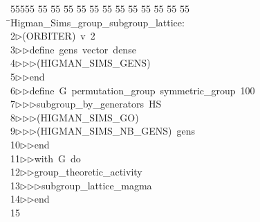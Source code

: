 %
%
\begin{tabbing}
55555 \= 55 \= 55 \= 55 \= 55 \= 55 \= 55 \= 55 \= 55 \= 55 \= 55 \= 55 \= 55 \= \>Higman\_Sims\_group\_subgroup\_lattice:\\[0pt]
2\>$\triangleright$\>(ORBITER)\ v\ 2\ \\[0pt]
3\>$\triangleright$\>$\triangleright$\>define\ gens\ vector\ dense\ \\[0pt]
4\>$\triangleright$\>$\triangleright$\>$\triangleright$\>(HIGMAN\_SIMS\_GENS)\ \\[0pt]
5\>$\triangleright$\>$\triangleright$\>end\ \\[0pt]
6\>$\triangleright$\>$\triangleright$\>define\ G\ permutation\_group\ symmetric\_group\ 100\ \\[0pt]
7\>$\triangleright$\>$\triangleright$\>$\triangleright$\>subgroup\_by\_generators\ HS\ \\[0pt]
8\>$\triangleright$\>$\triangleright$\>$\triangleright$\>(HIGMAN\_SIMS\_GO)\ \\[0pt]
9\>$\triangleright$\>$\triangleright$\>$\triangleright$\>(HIGMAN\_SIMS\_NB\_GENS)\ gens\ \\[0pt]
10\>$\triangleright$\>$\triangleright$\>end\ \\[0pt]
11\>$\triangleright$\>$\triangleright$\>with\ G\ do\ \\[0pt]
12\>$\triangleright$\>$\triangleright$\>group\_theoretic\_activity\ \\[0pt]
13\>$\triangleright$\>$\triangleright$\>$\triangleright$\>subgroup\_lattice\_magma\ \\[0pt]
14\>$\triangleright$\>$\triangleright$\>end\\[0pt]
15\>\end{tabbing}
